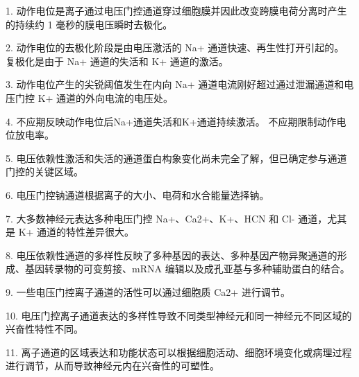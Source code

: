 1. 动作电位是离子通过电压门控通道穿过细胞膜并因此改变跨膜电荷分离时产生的持续约 1 毫秒的膜电压瞬时去极化。 


2. 动作电位的去极化阶段是由电压激活的 Na+ 通道快速、再生性打开引起的。 
复极化是由于 Na+ 通道的失活和 K+ 通道的激活。 


3. 动作电位产生的尖锐阈值发生在内向 Na+ 通道电流刚好超过通过泄漏通道和电压门控 K+ 通道的外向电流的电压处。 


4. 不应期反映动作电位后Na+通道失活和K+通道持续激活。 
不应期限制动作电位放电率。 


5. 电压依赖性激活和失活的通道蛋白构象变化尚未完全了解，但已确定参与通道门控的关键区域。 


6. 电压门控钠通道根据离子的大小、电荷和水合能量选择钠。 


7. 大多数神经元表达多种电压门控 Na+、Ca2+、K+、HCN 和 Cl- 通道，尤其是 K+ 通道的特性差异很大。 


8. 电压依赖性通道的多样性反映了多种基因的表达、多种基因产物异聚通道的形成、基因转录物的可变剪接、mRNA 编辑以及成孔亚基与多种辅助蛋白的结合。 


9. 一些电压门控离子通道的活性可以通过细胞质 Ca2+ 进行调节。 


10. 电压门控离子通道表达的多样性导致不同类型神经元和同一神经元不同区域的兴奋性特性不同。 


11. 离子通道的区域表达和功能状态可以根据细胞活动、细胞环境变化或病理过程进行调节，从而导致神经元内在兴奋性的可塑性。


%

